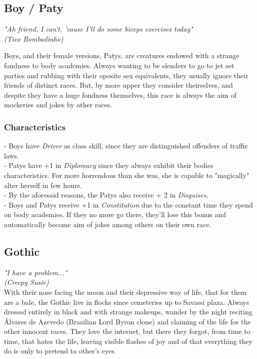 \documentclass[ letterpaper,12pt]{article}
\begin{document}
\subsection{Boy / Paty}
{\it "Ah friend, I can't, 'cause I'll do some biceps exercises today"\\
(Tico Bombadinho)\\}

Boys, and their female versions, Patys, are creatures endowed with a strange fondness to body academies. Always wanting to be slenders to go to jet set parties and rubbing with their oposite sex equivalents, they usually ignore their friends of distinct races. But, by more upper they consider theirselves, and despite they have a huge fondness themselves, this race is always the aim of mockeries and jokes by other races.\\

\subsubsection{Characteristics}
- Boys have {\it Driver} as class skill, since they are distinguished offenders of traffic laws.\\
- Patys have +1 in {\it Diplomacy} since they always exhibit their bodies characteristics. For more horrendous than she was, she is capable to "magically" alter herself in few hours.\\
- By the aforesaid reasons, the Patys also receive + 2 in {\it Disguises}.\\
- Boys and Patys receive +1 in {\it Constitution} due to the constant time they spend on body academies. If they no more go there, they'll lose this bonus and automatically become aim of jokes among others on their own race.\\

\subsection{Gothic}
{\it "I have a problem..."
\\(Creepy Susie)}\\

With their nose facing the moon and their depressive way of life, that for them are a bale, the Gothic live in flocks since cemeteries up to Savassi plaza.  Always dressed entirely in black and with strange makeups, wander by the night reciting Álvares de Azevedo (Brazilian Lord Byron clone) and claiming of the life for the other innocent races. They love the internet, but there they forgot, from time to time, that hates the life, leaving visible flashes of joy and of that everything they do is only to pretend to other's eyes. 
\end{document}
